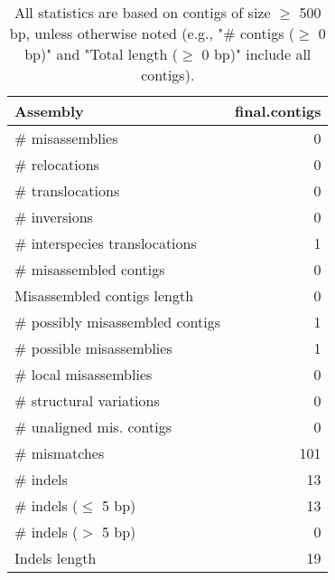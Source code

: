 \documentclass[12pt,a4paper]{article}
\begin{document}
\begin{table}[ht]
\begin{center}
\caption{All statistics are based on contigs of size $\geq$ 500 bp, unless otherwise noted (e.g., "\# contigs ($\geq$ 0 bp)" and "Total length ($\geq$ 0 bp)" include all contigs).}
\begin{tabular}{|l*{1}{|r}|}
\hline
Assembly & final.contigs \\ \hline
\# misassemblies & 0 \\ \hline
\hspace{5mm}\# relocations & 0 \\ \hline
\hspace{5mm}\# translocations & 0 \\ \hline
\hspace{5mm}\# inversions & 0 \\ \hline
\hspace{5mm}\# interspecies translocations & 1 \\ \hline
\# misassembled contigs & 0 \\ \hline
Misassembled contigs length & 0 \\ \hline
\# possibly misassembled contigs & 1 \\ \hline
\hspace{5mm}\# possible misassemblies & 1 \\ \hline
\# local misassemblies & 0 \\ \hline
\# structural variations & 0 \\ \hline
\# unaligned mis. contigs & 0 \\ \hline
\# mismatches & 101 \\ \hline
\# indels & 13 \\ \hline
\hspace{5mm}\# indels ($\leq$ 5 bp) & 13 \\ \hline
\hspace{5mm}\# indels ($>$ 5 bp) & 0 \\ \hline
Indels length & 19 \\ \hline
\end{tabular}
\end{center}
\end{table}
\end{document}

